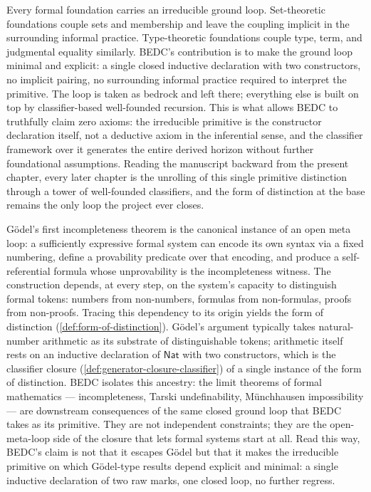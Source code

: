\begin{remark}
\label{rem:bedc-foundation-contribution}
Every formal foundation carries an irreducible ground loop. Set-theoretic foundations couple sets and membership and leave the coupling implicit in the surrounding informal practice. Type-theoretic foundations couple type, term, and judgmental equality similarly. BEDC's contribution is to make the ground loop minimal and explicit: a single closed inductive declaration with two constructors, no implicit pairing, no surrounding informal practice required to interpret the primitive. The loop is taken as bedrock and left there; everything else is built on top by classifier-based well-founded recursion. This is what allows BEDC to truthfully claim zero axioms: the irreducible primitive is the constructor declaration itself, not a deductive axiom in the inferential sense, and the classifier framework over it generates the entire derived horizon without further foundational assumptions. Reading the manuscript backward from the present chapter, every later chapter is the unrolling of this single primitive distinction through a tower of well-founded classifiers, and the form of distinction at the base remains the only loop the project ever closes.
\end{remark}

\begin{remark}
\label{rem:incompleteness-downstream}
G\"odel's first incompleteness theorem is the canonical instance of an open meta loop: a sufficiently expressive formal system can encode its own syntax via a fixed numbering, define a provability predicate over that encoding, and produce a self-referential formula whose unprovability is the incompleteness witness. The construction depends, at every step, on the system's capacity to distinguish formal tokens: numbers from non-numbers, formulas from non-formulas, proofs from non-proofs. Tracing this dependency to its origin yields the form of distinction (\autoref{def:form-of-distinction}). G\"odel's argument typically takes natural-number arithmetic as its substrate of distinguishable tokens; arithmetic itself rests on an inductive declaration of $\mathsf{Nat}$ with two constructors, which is the classifier closure (\autoref{def:generator-closure-classifier}) of a single instance of the form of distinction. BEDC isolates this ancestry: the limit theorems of formal mathematics --- incompleteness, Tarski undefinability, M\"unchhausen impossibility --- are downstream consequences of the same closed ground loop that BEDC takes as its primitive. They are not independent constraints; they are the open-meta-loop side of the closure that lets formal systems start at all. Read this way, BEDC's claim is not that it escapes G\"odel but that it makes the irreducible primitive on which G\"odel-type results depend explicit and minimal: a single inductive declaration of two raw marks, one closed loop, no further regress.
\end{remark}

